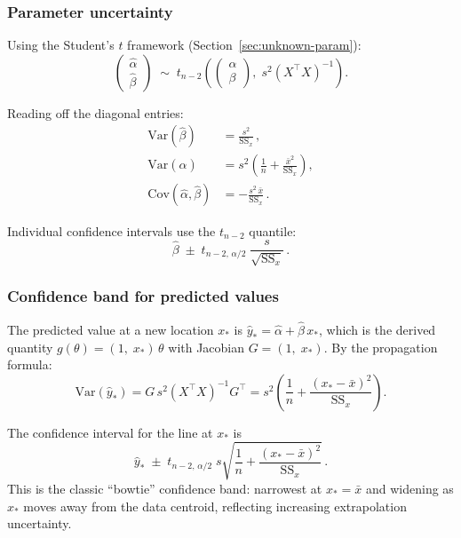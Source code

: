 \documentclass[11pt]{article}
\begin{document}
\subsubsection{Parameter uncertainty}

Using the Student's $t$ framework (Section~\ref{sec:unknown-param}):
\begin{equation}
  \boxed{
    \begin{pmatrix} \hat\alpha \\ \hat\beta \end{pmatrix}
    \;\sim\; t_{n-2}\!\left(
      \begin{pmatrix} \alpha \\ \beta \end{pmatrix},\;
      s^2 (X^\top X)^{-1}
    \right).
  }
\end{equation}

Reading off the diagonal entries:
\begin{align}
  \mathrm{Var}(\hat\beta) &= \frac{s^2}{\mathrm{SS}_x}\,, \\[6pt]
  \mathrm{Var}(\hat\alpha) &= s^2 \left(\frac{1}{n} + \frac{\bar{x}^2}{\mathrm{SS}_x}\right), \\[6pt]
  \mathrm{Cov}(\hat\alpha, \hat\beta) &= -\frac{s^2\, \bar{x}}{\mathrm{SS}_x}\,.
\end{align}

Individual confidence intervals use the $t_{n-2}$ quantile:
\begin{equation}
  \hat\beta \;\pm\; t_{n-2,\,\alpha/2}\;\frac{s}{\sqrt{\mathrm{SS}_x}}\,.
\end{equation}

\subsubsection{Confidence band for predicted values}

The predicted value at a new location $x_*$ is
$\hat{y}_* = \hat\alpha + \hat\beta\, x_*$,
which is the derived quantity $g(\theta) = (1,\; x_*)\, \theta$
with Jacobian $G = (1,\; x_*)$. By the propagation formula:
\begin{equation}
  \mathrm{Var}(\hat{y}_*)
  = G\, s^2 (X^\top X)^{-1} G^\top
  = s^2 \left(\frac{1}{n} + \frac{(x_* - \bar{x})^2}{\mathrm{SS}_x}\right).
\end{equation}

The confidence interval for the line at $x_*$ is
\begin{equation}
  \boxed{
    \hat{y}_* \;\pm\; t_{n-2,\,\alpha/2}\; s
    \sqrt{\frac{1}{n} + \frac{(x_* - \bar{x})^2}{\mathrm{SS}_x}}\,.
  }
\end{equation}
This is the classic ``bowtie'' confidence band: narrowest at $x_* = \bar{x}$
and widening as $x_*$ moves away from the data centroid, reflecting increasing
extrapolation uncertainty.
\end{document}
